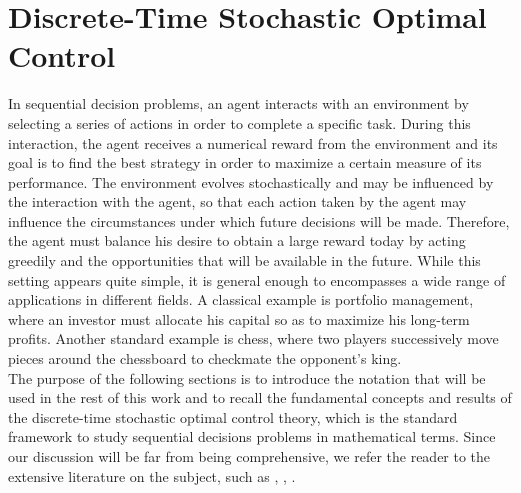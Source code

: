 \chapter{Discrete-Time Stochastic Optimal Control}
\label{ch:discrete_time_stochastic_optimal_control}

In sequential decision problems, an agent interacts with an environment by
selecting a series of actions in order to complete a specific task. During this
interaction, the agent receives a numerical reward from the environment and its
goal is to find the best strategy in order to maximize a certain measure of its
performance. The environment evolves stochastically and may be influenced by
the interaction with the agent, so that each action taken by the agent may 
influence the circumstances under which future decisions will be made. 
Therefore, the agent must balance his desire to obtain a large reward today 
by acting greedily and the opportunities that will be available in the future. 
While this setting appears quite simple, it is general enough to encompasses a 
wide range of applications in different fields. A classical example is 
portfolio management, where an investor must allocate his capital so as to 
maximize his long-term profits. Another standard example is chess, where two
players successively move pieces around the chessboard to checkmate the
opponent's king.\\
The purpose of the following sections is to introduce the notation that will be
used in the rest of this work and to recall the fundamental concepts and 
results of the discrete-time stochastic optimal control theory, which is the 
standard framework to study sequential decisions problems in mathematical
terms. Since our discussion will be far from being comprehensive, we refer the
reader to the extensive literature on the subject, such as
\cite{bertsekas1978stochastic}, \cite{puterman1994markov}, 
\cite{bertsekas1995dynamic}.

